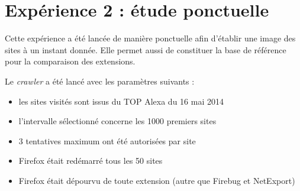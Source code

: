 \newpage
\section{Expérience 2 : étude ponctuelle}
\label{experience_ponctuelle}
Cette expérience a été lancée de manière ponctuelle afin d'établir une image des sites à un instant donnée. Elle permet aussi de constituer la base de référence pour la comparaison des extensions.
\newline

Le \textit{crawler} a été lancé avec les paramètres suivants :
\begin{itemize}
	\item les sites visités sont issus du TOP Alexa du 16 mai 2014
	\item l'intervalle sélectionné concerne les 1000 premiers sites
	\item 3 tentatives maximum ont été autorisées par site
	\item Firefox était redémarré tous les 50 sites
	\item Firefox était dépourvu de toute extension (autre que Firebug et NetExport)
\end{itemize}

